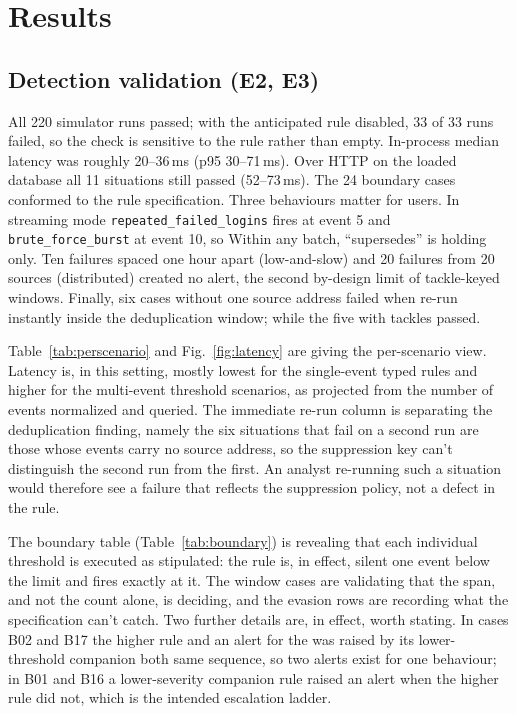 \documentclass[conference]{IEEEtran}
\newcommand{\code}[1]{\texttt{#1}}
\begin{document}
\section{Results}\label{sec:results}
\subsection{Detection validation (E2, E3)}
All 220 simulator runs passed; with the anticipated rule disabled, 33 of 33 runs failed, so the check is sensitive to the rule rather than empty. In-process median latency was roughly 20--36\,ms (p95 30--71\,ms). Over HTTP on the loaded database all 11 situations still passed (52--73\,ms). The 24 boundary cases conformed to the rule specification. Three behaviours matter for users. In streaming mode \code{repeated\_failed\_logins} fires at event 5 and \code{brute\_force\_burst} at event 10, so Within any batch, ``supersedes'' is holding only. Ten failures spaced one hour apart (low-and-slow) and 20 failures from 20 sources (distributed) created no alert, the second by-design limit of tackle-keyed windows. Finally, six cases without one source address failed when re-run instantly inside the deduplication window; while the five with tackles passed.

Table~\ref{tab:perscenario} and Fig.~\ref{fig:latency} are giving the per-scenario view. Latency is, in this setting, mostly lowest for the single-event typed rules and higher for the multi-event threshold scenarios, as projected from the number of events normalized and queried. The immediate re-run column is separating the deduplication finding, namely the six situations that fail on a second run are those whose events carry no source address, so the suppression key can't distinguish the second run from the first. An analyst re-running such a situation would therefore see a failure that reflects the suppression policy, not a defect in the rule.

The boundary table (Table~\ref{tab:boundary}) is revealing that each individual threshold is executed as stipulated: the rule is, in effect, silent one event below the limit and fires exactly at it. The window cases are validating that the span, and not the count alone, is deciding, and the evasion rows are recording what the specification can't catch. Two further details are, in effect, worth stating. In cases B02 and B17 the higher rule and an alert for the was raised by its lower-threshold companion both same sequence, so two alerts exist for one behaviour; in B01 and B16 a lower-severity companion rule raised an alert when the higher rule did not, which is the intended escalation ladder.
\end{document}
